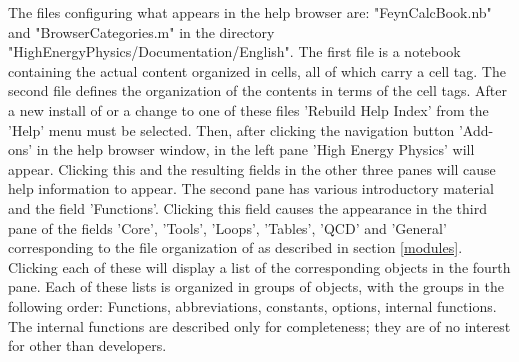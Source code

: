 The files configuring what appears in the help browser are: "FeynCalcBook.nb" and "BrowserCategories.m" in the directory "HighEnergyPhysics/Documentation/English". The first file is a notebook containing the actual content organized in cells, all of which carry a cell tag. The second file defines the organization of the contents in terms of the cell tags. After a new install of \fc or a change to one of these files 'Rebuild Help Index' from the 'Help' menu must be selected. Then, after clicking the navigation button 'Add-ons' in the help browser window, in the left pane 'High Energy Physics' will appear. Clicking this and the resulting fields in the other three panes will cause \fc help information to appear. The second pane has various introductory material and the field 'Functions'. Clicking this field causes the appearance in the third pane of the fields 'Core', 'Tools', 'Loops', 'Tables', 'QCD' and 'General' corresponding to the file organization of \fc as described in section \ref{modules}. Clicking each of these will display a list of the corresponding objects in the fourth pane. Each of these lists is organized in groups of objects, with the groups in the following order: Functions, abbreviations, constants, options, internal functions. The internal functions are described only for completeness; they are of no interest for other than developers.

